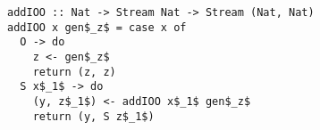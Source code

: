 \begin{figure}[!t]
  \centering
  \begin{minipage}{\columnwidth}
    \begin{lstlisting}[frame=tb]
addIOO :: Nat -> Stream Nat -> Stream (Nat, Nat)
addIOO x gen$_z$ = case x of
  O -> do
    z <- gen$_z$
    return (z, z)
  S x$_1$ -> do
    (y, z$_1$) <- addIOO x$_1$ gen$_z$
    return (y, S z$_1$)
    \end{lstlisting}
  \end{minipage}
\end{figure}
